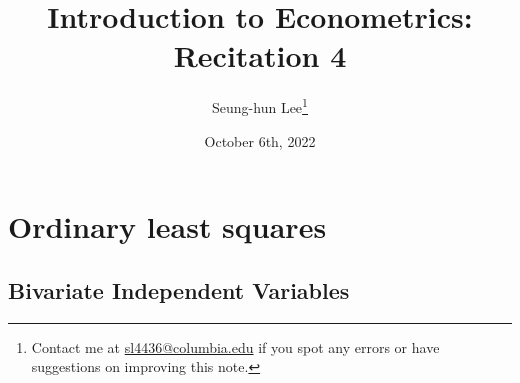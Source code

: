 \documentclass[12pt]{article}
\title{Introduction to Econometrics: Recitation 4}
\theoremstyle{definition}
\theoremstyle{property}
\theoremstyle{assumption}
\theoremstyle{example}
\theoremstyle{comment}
\begin{document}
\linespread{1.25}
\onehalfspacing

\author{Seung-hun Lee\footnote{Contact me at \href{mailto:sl4436@columbia.edu}{sl4436@columbia.edu} if you spot any errors or have suggestions on improving this note.}}
\date{October 6th, 2022}
\maketitle
\thispagestyle{firstpage}


\section{Ordinary least squares}
\subsection{Bivariate Independent Variables}
\end{document}

